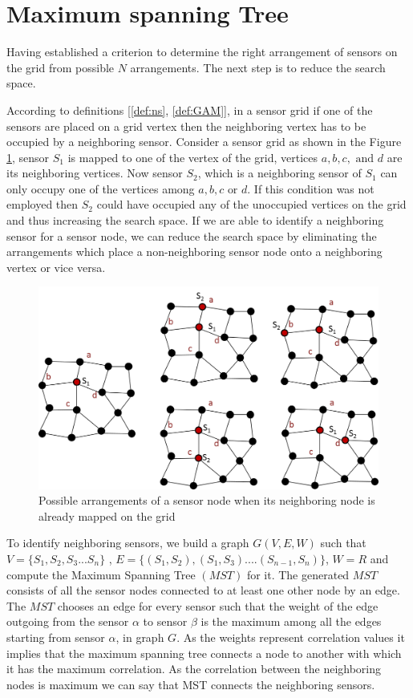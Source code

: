 \section{Maximum spanning Tree}

Having established a criterion to determine the right arrangement of sensors on the grid from  possible ${N}$ arrangements. The next step is to reduce the search space.

According to definitions [\ref{def:ns}, \ref{def:GAM}], in a sensor grid if one of the sensors are placed on a grid vertex then the neighboring vertex has to be occupied by a neighboring sensor. Consider a sensor grid as shown in the Figure \ref{fig:prune}, sensor $S_1$ is mapped to one of the vertex of the grid, vertices $a,b,c,\text{ and }d$ are its neighboring vertices. Now sensor $S_2$, which is a neighboring sensor of $S_1$ can only occupy one of the vertices among $a,b,c\text{ or }d$. If this condition was not employed then $S_2$ could have occupied any of the unoccupied vertices on the grid and thus increasing the search space. If we are able to identify a neighboring sensor for a sensor node, we can reduce the search space by eliminating the arrangements which place a non-neighboring sensor node onto a neighboring vertex or vice versa.
\begin{figure}[!ht]
\includegraphics[scale=0.5]{./pics/prune}
\centering
\caption{Possible arrangements of a sensor node when its neighboring node is already mapped on the grid}
\label{fig:prune}
\end{figure}



To identify neighboring sensors, we build a graph $G(V,E,W)$ such that $V = \{S_1,S_2,S_3...S_n\}$ , $ E= \{(S_1,S_2),(S_1,S_3)....(S_{n-1},S_n)\}$, $W = R$ and compute the Maximum Spanning Tree $(MST)$ for it. The generated $MST$ consists of all the sensor nodes connected to at least one other node by an edge. The $MST$ chooses an edge for every sensor such that the weight of the edge outgoing from the sensor $\alpha$ to sensor $\beta$ is the maximum among all the edges starting from sensor $\alpha$, in graph ${G}$. As the weights represent correlation values it implies that the maximum spanning tree connects a node to another with which it has the maximum correlation. As the correlation between the neighboring nodes is maximum we can say that MST connects the neighboring sensors.

